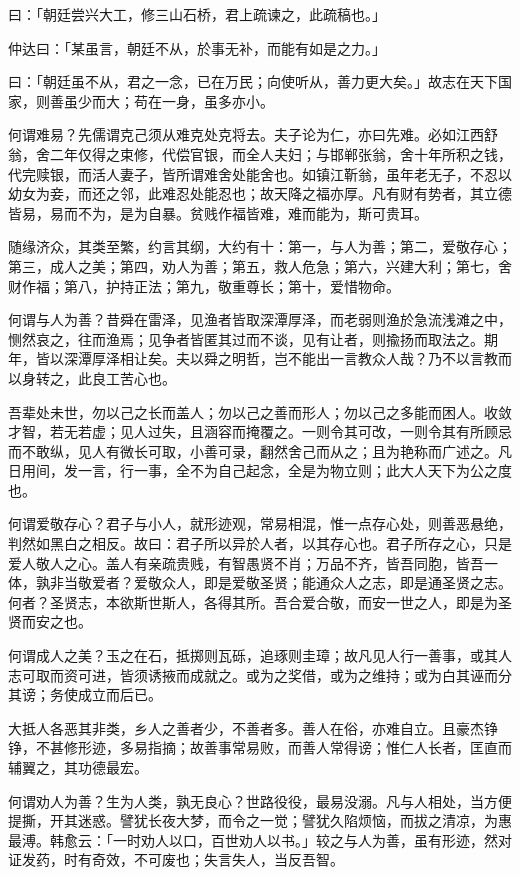 \documentclass[letterpaper,12pt,english]{sphinxmanual}
\begin{document}
曰：「朝廷尝兴大工，修三山石桥，君上疏谏之，此疏稿也。」

仲达曰：「某虽言，朝廷不从，於事无补，而能有如是之力。」

曰：「朝廷虽不从，君之一念，已在万民；向使听从，善力更大矣。」故志在天下国家，则善虽少而大；苟在一身，虽多亦小。

何谓难易？先儒谓克己须从难克处克将去。夫子论为仁，亦曰先难。必如江西舒翁，舍二年仅得之束修，代偿官银，而全人夫妇；与邯郸张翁，舍十年所积之钱，代完赎银，而活人妻子，皆所谓难舍处能舍也。如镇江靳翁，虽年老无子，不忍以幼女为妾，而还之邻，此难忍处能忍也；故天降之福亦厚。凡有财有势者，其立德皆易，易而不为，是为自暴。贫贱作福皆难，难而能为，斯可贵耳。

随缘济众，其类至繁，约言其纲，大约有十：第一，与人为善；第二，爱敬存心；第三，成人之美；第四，劝人为善；第五，救人危急；第六，兴建大利；第七，舍财作福；第八，护持正法；第九，敬重尊长；第十，爱惜物命。

何谓与人为善？昔舜在雷泽，见渔者皆取深潭厚泽，而老弱则渔於急流浅滩之中，恻然哀之，往而渔焉；见争者皆匿其过而不谈，见有让者，则揄扬而取法之。期年，皆以深潭厚泽相让矣。夫以舜之明哲，岂不能出一言教众人哉？乃不以言教而以身转之，此良工苦心也。

吾辈处未世，勿以己之长而盖人；勿以己之善而形人；勿以己之多能而困人。收敛才智，若无若虚；见人过失，且涵容而掩覆之。一则令其可改，一则令其有所顾忌而不敢纵，见人有微长可取，小善可录，翻然舍己而从之；且为艳称而广述之。凡日用间，发一言，行一事，全不为自己起念，全是为物立则；此大人天下为公之度也。

何谓爱敬存心？君子与小人，就形迹观，常易相混，惟一点存心处，则善恶悬绝，判然如黑白之相反。故曰：君子所以异於人者，以其存心也。君子所存之心，只是爱人敬人之心。盖人有亲疏贵贱，有智愚贤不肖；万品不齐，皆吾同胞，皆吾一体，孰非当敬爱者？爱敬众人，即是爱敬圣贤；能通众人之志，即是通圣贤之志。何者？圣贤志，本欲斯世斯人，各得其所。吾合爱合敬，而安一世之人，即是为圣贤而安之也。

何谓成人之美？玉之在石，抵掷则瓦砾，追琢则圭璋；故凡见人行一善事，或其人志可取而资可进，皆须诱掖而成就之。或为之奖借，或为之维持；或为白其诬而分其谤；务使成立而后已。

大抵人各恶其非类，乡人之善者少，不善者多。善人在俗，亦难自立。且豪杰铮铮，不甚修形迹，多易指摘；故善事常易败，而善人常得谤；惟仁人长者，匡直而辅翼之，其功德最宏。

何谓劝人为善？生为人类，孰无良心？世路役役，最易没溺。凡与人相处，当方便提撕，开其迷惑。譬犹长夜大梦，而令之一觉；譬犹久陷烦恼，而拔之清凉，为惠最溥。韩愈云：「一时劝人以口，百世劝人以书。」较之与人为善，虽有形迹，然对证发药，时有奇效，不可废也；失言失人，当反吾智。
\end{document}
